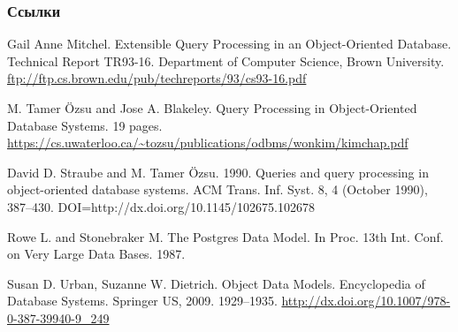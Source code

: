 \documentclass{beamer}
\begin{document}
\begin{frame}[allowframebreaks]
\frametitle{Ссылки}
\footnotesize{
\begin{thebibliography}{99}

 Gail Anne Mitchel. Extensible Query Processing in an Object-Oriented Database. Technical Report TR93-16. Department of Computer Science, Brown University. \url{ftp://ftp.cs.brown.edu/pub/techreports/93/cs93-16.pdf}

 M. Tamer Özsu and Jose A. Blakeley. Query Processing in Object-Oriented Database Systems. 19 pages. \url{https://cs.uwaterloo.ca/~tozsu/publications/odbms/wonkim/kimchap.pdf}

 David D. Straube and M. Tamer Özsu. 1990. Queries and query processing in object-oriented database systems. ACM Trans. Inf. Syst. 8, 4 (October 1990), 387--430. DOI=http://dx.doi.org/10.1145/102675.102678 

 Rowe L. and Stonebraker M. The Postgres Data Model. In Proc. 13th Int. Conf. on Very Large Data Bases. 1987.

 Susan D. Urban, Suzanne W. Dietrich. Object Data Models. Encyclopedia of Database Systems. Springer US, 2009. 1929--1935. \url{http://dx.doi.org/10.1007/978-0-387-39940-9_249}






\end{thebibliography}}
\end{frame}
\end{document}
